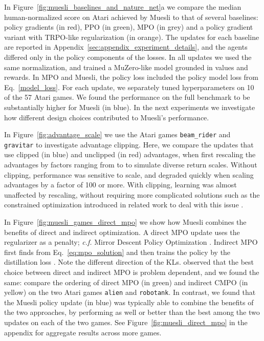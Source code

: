 \documentclass{article}
\begin{document}
In Figure~\ref{fig:muesli_baselines_and_nature_net}a we compare the median human-normalized score on Atari achieved by Muesli to that of several baselines: policy gradients (in red), PPO (in green), MPO (in grey) and a policy gradient variant with TRPO-like  regularization (in orange). The updates for each baseline are reported in Appendix~\ref{sec:appendix_experiment_details}, and the  agents differed only in the policy components of the losses. In all updates we used the same normalization, and trained a MuZero-like model grounded in values and rewards. In MPO and Muesli, the policy loss included the policy model loss from Eq.~\ref{model_loss}. For each update, we separately tuned hyperparameters on 10 of the 57 Atari games. We found the performance on the full benchmark to be substantially higher for Muesli (in blue). In the next experiments we investigate how different design choices contributed to Muesli's performance.

In Figure~\ref{fig:advantage_scale} we use the Atari games \texttt{beam\_rider} and \texttt{gravitar} to investigate advantage clipping. Here, we compare the updates that use clipped (in blue) and unclipped (in red) advantages, when first rescaling the advantages by factors ranging from  to  to simulate diverse return scales. Without clipping, performance was sensitive to scale, and degraded quickly when scaling advantages by a factor of 100 or more. With clipping, learning was almost unaffected by rescaling, without requiring more complicated solutions such as the constrained optimization introduced in related work to deal with this issue \cite{abdolmaleki2018maximum}.

In Figure~\ref{fig:muesli_games_direct_mpo} we show how Muesli combines the benefits of direct and indirect optimization. A direct MPO update uses the  regularizer as a penalty; \emph{c.f.} Mirror Descent Policy Optimization \citep{tomar2020mirror}. Indirect MPO first finds  from Eq.~\ref{eq:mpo_solution} and then trains the policy  by the distillation loss . Note the different direction of the KLs. \citet{vieillard2020} observed that the best choice between direct and indirect MPO is problem dependent, and we found the same: compare the ordering of direct MPO (in green) and indirect CMPO (in yellow) on the two Atari games \texttt{alien} and \texttt{robotank}. In contrast, we found that the Muesli policy update (in blue) was typically able to combine the benefits of the two approaches, by performing as well or better than the best among the two updates on each of the two games.  See Figure~\ref{fig:muesli_direct_mpo} in the appendix for aggregate results across more games.
\end{document}
